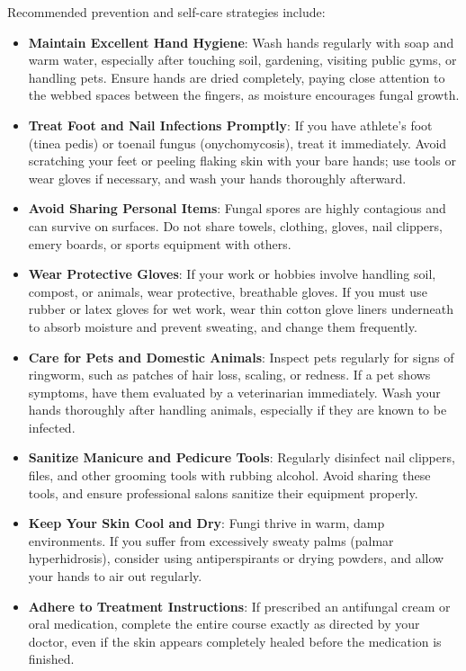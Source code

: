 Recommended prevention and self-care strategies include:
\begin{itemize}
    \item \textbf{Maintain Excellent Hand Hygiene}: Wash hands regularly with soap and warm water, especially after touching soil, gardening, visiting public gyms, or handling pets. Ensure hands are dried completely, paying close attention to the webbed spaces between the fingers, as moisture encourages fungal growth.
    \item \textbf{Treat Foot and Nail Infections Promptly}: If you have athlete's foot (tinea pedis) or toenail fungus (onychomycosis), treat it immediately. Avoid scratching your feet or peeling flaking skin with your bare hands; use tools or wear gloves if necessary, and wash your hands thoroughly afterward.
    \item \textbf{Avoid Sharing Personal Items}: Fungal spores are highly contagious and can survive on surfaces. Do not share towels, clothing, gloves, nail clippers, emery boards, or sports equipment with others.
    \item \textbf{Wear Protective Gloves}: If your work or hobbies involve handling soil, compost, or animals, wear protective, breathable gloves. If you must use rubber or latex gloves for wet work, wear thin cotton glove liners underneath to absorb moisture and prevent sweating, and change them frequently.
    \item \textbf{Care for Pets and Domestic Animals}: Inspect pets regularly for signs of ringworm, such as patches of hair loss, scaling, or redness. If a pet shows symptoms, have them evaluated by a veterinarian immediately. Wash your hands thoroughly after handling animals, especially if they are known to be infected.
    \item \textbf{Sanitize Manicure and Pedicure Tools}: Regularly disinfect nail clippers, files, and other grooming tools with rubbing alcohol. Avoid sharing these tools, and ensure professional salons sanitize their equipment properly.
    \item \textbf{Keep Your Skin Cool and Dry}: Fungi thrive in warm, damp environments. If you suffer from excessively sweaty palms (palmar hyperhidrosis), consider using antiperspirants or drying powders, and allow your hands to air out regularly.
    \item \textbf{Adhere to Treatment Instructions}: If prescribed an antifungal cream or oral medication, complete the entire course exactly as directed by your doctor, even if the skin appears completely healed before the medication is finished.
\end{itemize}

